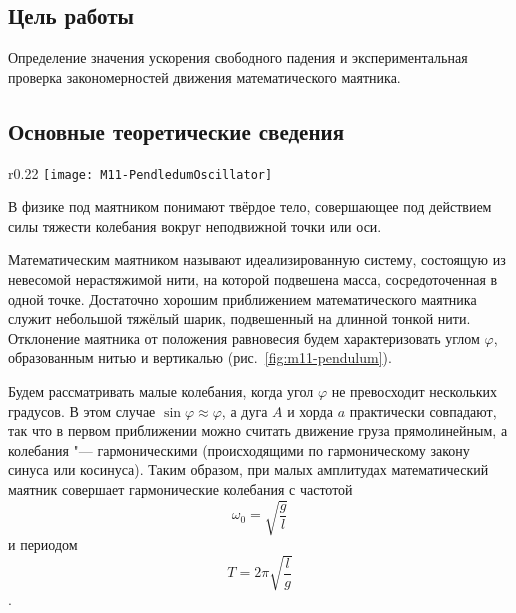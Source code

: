 \documentclass[a4paper, 12pt]{extarticle}
\begin{document}
\MTDTitlePage
\MTDInfoPage

\setcounter{section}{11}

\subsection{Цель работы}
Определение значения ускорения свободного падения и экспериментальная проверка закономерностей движения математического маятника.

\subsection{Основные теоретические сведения}

\begin{wrapfigure}{r}{0.22\textwidth}
 \centering
\texttt{[image: M11-PendledumOscillator]}
\caption{\label{fig:m11-pendulum}}
\end{wrapfigure}

В физике под маятником понимают твёрдое тело, совершающее под действием силы тяжести колебания вокруг неподвижной точки или оси.

Математическим маятником называют идеализированную систему, состоящую из невесомой нерастяжимой нити, на которой подвешена масса, сосредоточенная в одной точке. Достаточно хорошим приближением математического маятника служит небольшой тяжёлый шарик, подвешенный на длинной тонкой нити. Отклонение маятника от положения равновесия будем характеризовать углом $\varphi$, образованным нитью и вертикалью (рис.~\ref{fig:m11-pendulum}). %

Будем рассматривать малые колебания, когда угол $\varphi$ не превосходит нескольких градусов. В этом случае $\sin \varphi \approx \varphi$, а дуга $A$ и хорда $a$ практически совпадают, так что в первом приближении можно считать движение груза прямолинейным, а колебания "--- гармоническими (происходящими по гармоническому закону синуса или косинуса). Таким образом, при малых амплитудах математический маятник совершает гармонические колебания с частотой \[\omega_0 = \sqrt{\frac{g}{l}}\] и периодом \[T = 2 \pi \sqrt{\frac{l}{g}}\]. %
\end{document}
